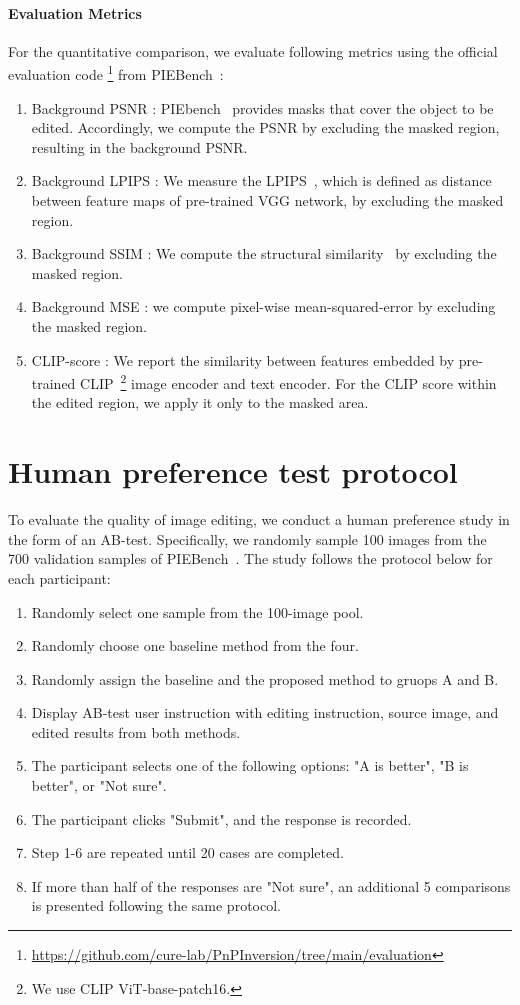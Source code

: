 \paragraph{Evaluation Metrics}
For the quantitative comparison, we evaluate following metrics using the official evaluation code \footnote{\url{https://github.com/cure-lab/PnPInversion/tree/main/evaluation}} from PIEBench~\cite{ju2024pnp}:
\begin{enumerate}
    \item Background PSNR : PIEbench~\cite{ju2024pnp} provides masks that cover the object to be edited. Accordingly, we compute the PSNR by excluding the masked region, resulting in the background PSNR.
    \item Background LPIPS : We measure the LPIPS~\cite{blau2018perception}, which is defined as distance between feature maps of pre-trained VGG network, by excluding the masked region.
    \item Background SSIM : We compute the structural similarity~\cite{wang2004image} by excluding the masked region.
    \item Background MSE : we compute pixel-wise mean-squared-error by excluding the masked region.
    \item CLIP-score : We report the similarity between features embedded by pre-trained CLIP~\cite{radford2021learning}\footnote{We use CLIP ViT-base-patch16.} image encoder and text encoder. For the CLIP score within the edited region, we apply it only to the masked area.
\end{enumerate}

\section{Human preference test protocol}
\label{sec:human}
To evaluate the quality of image editing, we conduct a human preference study in the form of an AB-test. Specifically, we randomly sample 100 images from the 700 validation samples of PIEBench~\cite{ju2024pnp}. The study follows the protocol below for each participant:

\begin{enumerate}
    \item Randomly select one sample from the 100-image pool.
    \item Randomly choose one baseline method from the four.
    \item Randomly assign the baseline and the proposed method to gruops A and B.
    \item Display AB-test user instruction with editing instruction, source image, and edited results from both methods.
    \item The participant selects one of the following options: "A is better", "B is better", or "Not sure".
    \item The participant clicks "Submit", and the response is recorded.
    \item Step 1-6 are repeated until 20 cases are completed.
    \item If more than half of the responses are "Not sure", an additional 5 comparisons is presented following the same protocol.
\end{enumerate}

